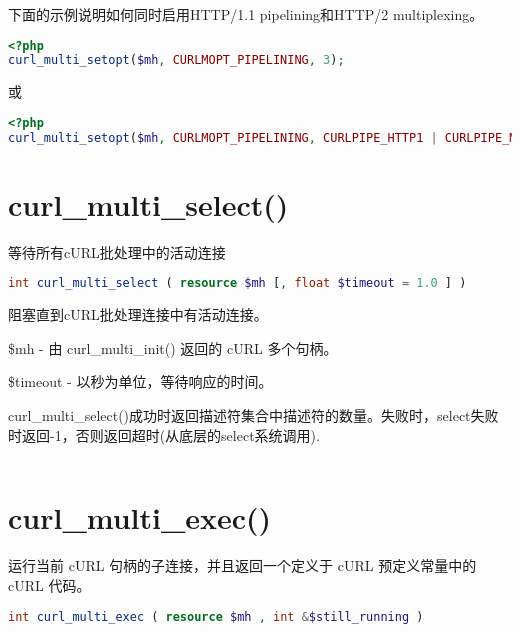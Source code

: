 下面的示例说明如何同时启用HTTP/1.1 pipelining和HTTP/2 multiplexing。

\begin{lstlisting}[language=PHP]
<?php
curl_multi_setopt($mh, CURLMOPT_PIPELINING, 3);
\end{lstlisting}

或

\begin{lstlisting}[language=PHP]
<?php
curl_multi_setopt($mh, CURLMOPT_PIPELINING, CURLPIPE_HTTP1 | CURLPIPE_MULTIPLEX);
\end{lstlisting}

\section{curl\_multi\_select()}

等待所有cURL批处理中的活动连接


\begin{lstlisting}[language=PHP]
int curl_multi_select ( resource $mh [, float $timeout = 1.0 ] )
\end{lstlisting}

阻塞直到cURL批处理连接中有活动连接。

\begin{compactitem}
\item \$mh - 由 curl\_multi\_init() 返回的 cURL 多个句柄。
\item \$timeout - 以秒为单位，等待响应的时间。
\end{compactitem}

curl\_multi\_select()成功时返回描述符集合中描述符的数量。失败时，select失败时返回-1，否则返回超时(从底层的select系统调用).


\begin{lstlisting}[language=PHP]

\end{lstlisting}

\section{curl\_multi\_exec()}

运行当前 cURL 句柄的子连接，并且返回一个定义于 cURL 预定义常量中的 cURL 代码。



\begin{lstlisting}[language=PHP]
int curl_multi_exec ( resource $mh , int &$still_running )
\end{lstlisting}

